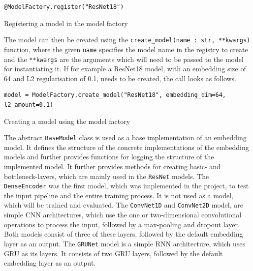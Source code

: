 \begin{code}[htbp]
\begin{verbatim}
@ModelFactory.register("ResNet18")
\end{verbatim}
\caption{Registering a model in the model factory}
\label{code:Model-Factory}
\end{code}
\noindent
The model can then be created using the \texttt{create\_model(name : str, **kwargs)} function, where the given \texttt{name} specifies the model name in the registry to create and the \texttt{**kwargs} are the arguments which will need to be passed to the model for instantiating it. If for example a ResNet18 model, with an embedding size of 64 and L2 regularisation of 0.1, needs to be created, the call looks as follows.

\begin{code}[htbp]
\begin{verbatim}
model = ModelFactory.create_model("ResNet18", embedding_dim=64, l2_amount=0.1)
\end{verbatim}
\caption{Creating a model using the model factory}
\label{code:Model-Factory-Creating}
\end{code}
\noindent
The abstract \texttt{BaseModel} class is used as a base implementation of an embedding model. It defines the structure of the concrete implementations of the embedding models and further provides functions for logging the structure of the implemented model. It further provides methods for creating basic- and bottleneck-layers, which are mainly used in the \texttt{ResNet} models.
\newline
\newline
The \texttt{DenseEncoder} was the first model, which was implemented in the project, to test the input pipeline and the entire training process. It is not used as a model, which will be trained and evaluated.
\newline
\newline
The \texttt{ConvNet1D} and \texttt{ConvNet2D} model, are simple \gls{CNN} architectures, which use the one or two-dimensional convolutional operations to process the input, followed by a max-pooling and dropout layer. Both models consist of three of these layers, followed by the default embedding layer as an output.
\newline
\newline
The \texttt{GRUNet} model is a simple \gls{RNN} architecture, which uses \gls{GRU} as its layers. It consists of two \gls{GRU} layers, followed by the default embedding layer as an output.
